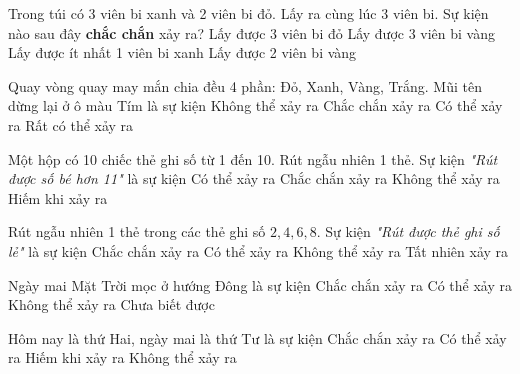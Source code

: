 \begin{ex} %
Trong túi có 3 viên bi xanh và 2 viên bi đỏ. Lấy ra cùng lúc 3 viên bi. Sự kiện nào sau đây \textbf{chắc chắn} xảy ra?
\choice
{Lấy được 3 viên bi đỏ}
{Lấy được 3 viên bi vàng}
{\True Lấy được ít nhất 1 viên bi xanh}
{Lấy được 2 viên bi vàng}
\end{ex}

\begin{ex} %
Quay vòng quay may mắn chia đều 4 phần: Đỏ, Xanh, Vàng, Trắng. Mũi tên dừng lại ở ô màu Tím là sự kiện
\choice
{\True Không thể xảy ra}
{Chắc chắn xảy ra}
{Có thể xảy ra}
{Rất có thể xảy ra}
\end{ex}

\begin{ex} %
Một hộp có 10 chiếc thẻ ghi số từ 1 đến 10. Rút ngẫu nhiên 1 thẻ. Sự kiện \textit{"Rút được số bé hơn 11"} là sự kiện
\choice
{Có thể xảy ra}
{\True Chắc chắn xảy ra}
{Không thể xảy ra}
{Hiếm khi xảy ra}
\end{ex}

\begin{ex} %
Rút ngẫu nhiên 1 thẻ trong các thẻ ghi số $2, 4, 6, 8$. Sự kiện \textit{"Rút được thẻ ghi số lẻ"} là sự kiện
\choice
{Chắc chắn xảy ra}
{Có thể xảy ra}
{\True Không thể xảy ra}
{Tất nhiên xảy ra}
\end{ex}

\begin{ex} %
Ngày mai Mặt Trời mọc ở hướng Đông là sự kiện
\choice
{\True Chắc chắn xảy ra}
{Có thể xảy ra}
{Không thể xảy ra}
{Chưa biết được}
\end{ex}

\begin{ex} %
Hôm nay là thứ Hai, ngày mai là thứ Tư là sự kiện
\choice
{Chắc chắn xảy ra}
{Có thể xảy ra}
{Hiếm khi xảy ra}
{\True Không thể xảy ra}
\end{ex}

